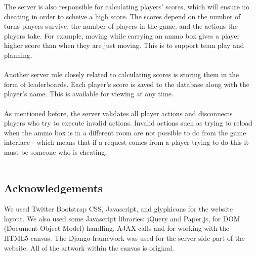 \documentclass{article}
\begin{document}
The server is also responsible for calculating players' scores, which will ensure no cheating in order to scheive a high score. The scores depend on the number of turns players survive, the number of players in the game, and the actions the players take. For example, moving while carrying an ammo box gives a player higher score than when they are just moving. This is to support team play and planning. \\ \\
Another server role closely related to calculating scores is storing them in the form of leaderboards. Each player's score is saved to the database along with the player's name. This is available for viewing at any time. \\ \\
As mentioned before, the server validates all player actions and disconnects players who try to execute invalid actions. Invalid actions such as trying to reload when the ammo box is in a different room are not possible to do from the game interface - which means that if a request comes from a player trying to do this it must be someone who is cheating. \\ \\

\subsection{Acknowledgements}
We used Twitter Bootstrap CSS, Javascript, and glyphicons for the website layout. We also used some Javascript libraries: jQuery and Paper.js, for DOM (Document Object Model) handling, AJAX calls and for working with the HTML5 canvas. The Django framework was used for the server-side part of the website. All of the artwork within the canvas is original. \\ \\
\end{document}
